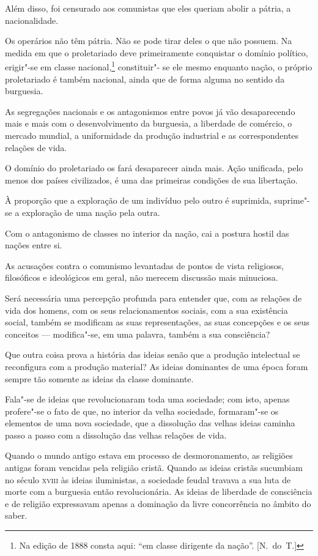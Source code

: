 Além disso, foi censurado aos comunistas que eles queriam abolir a
pátria, a nacionalidade.

Os operários não têm pátria. Não se pode tirar deles o que não
possuem. Na medida em que o proletariado deve primeiramente conquistar
o domínio político, erigir"-se em classe nacional,\footnote{ Na edição de 
1888 consta aqui: “em classe dirigente da nação”. [N.~do~T.]} constituir"-
se ele mesmo enquanto nação, o próprio
proletariado é também nacional, ainda que de forma alguma no sentido da
burguesia.

As segregações nacionais e os antagonismos entre povos já vão desaparecendo
mais e mais com o desenvolvimento da burguesia, a liberdade de
comércio, o mercado mundial, a uniformidade da produção industrial
e as correspondentes relações de vida.

O domínio do proletariado os fará desaparecer ainda mais. Ação
unificada, pelo menos dos países civilizados, é uma das primeiras
condições de sua libertação.

À proporção que a exploração de um indivíduo pelo outro é suprimida,
suprime"-se a exploração de uma nação pela outra.

Com o antagonismo de classes no interior da nação, cai a postura hostil
das nações entre si.

As acusações contra o comunismo levantadas de pontos de vista
religiosos, filosóficos e ideológicos em geral, não merecem discussão
mais minuciosa.

Será necessária uma percepção profunda para entender que, com as
relações de vida dos homens, com os seus relacionamentos sociais, com a
sua existência social, também se modificam as suas representações, as
suas concepções e os seus conceitos  ---  modifica"-se, em uma palavra,
também a sua consciência?

Que outra coisa prova a história das ideias senão que a produção
intelectual se reconfigura com a produção material? As ideias
dominantes de uma época foram sempre tão somente as ideias da classe
dominante.

Fala"-se de ideias que revolucionaram toda uma sociedade; com isto,
apenas profere"-se o fato de que, no interior da velha sociedade,
formaram"-se os elementos de uma nova sociedade, que a dissolução das
velhas ideias caminha passo a passo com a dissolução das velhas
relações de vida.

Quando o mundo antigo estava em processo de desmoronamento, as religiões
antigas foram vencidas pela religião cristã. Quando as ideias cristãs
sucumbiam no século \textsc{xviii} às ideias iluministas, a sociedade feudal
travava a sua luta de morte com a burguesia então revolucionária. As
ideias de liberdade de consciência e de religião expressavam apenas a
dominação da livre concorrência no âmbito do saber.

